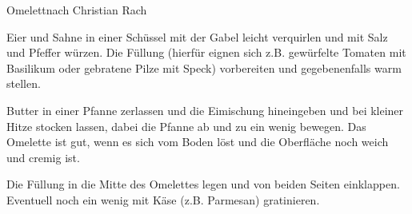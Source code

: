 \begin{recipe}{Omelett}{nach Christian Rach}
  \inglist

  \steps
  Eier und Sahne in einer Schüssel mit der Gabel leicht verquirlen und mit Salz und
  Pfeffer würzen. Die Füllung (hierfür eignen sich z.B. gewürfelte Tomaten mit Basilikum
  oder gebratene Pilze mit Speck) vorbereiten und gegebenenfalls warm stellen.

  Butter in einer Pfanne zerlassen und die Eimischung hineingeben und bei kleiner Hitze
  stocken lassen, dabei die Pfanne ab und zu ein wenig bewegen. Das Omelette ist gut, wenn
  es sich vom Boden löst und die Oberfläche noch weich und cremig ist.

  Die Füllung in die Mitte des Omelettes legen und von beiden Seiten einklappen. Eventuell
  noch ein wenig mit Käse (z.B. Parmesan) gratinieren.
\end{recipe}

